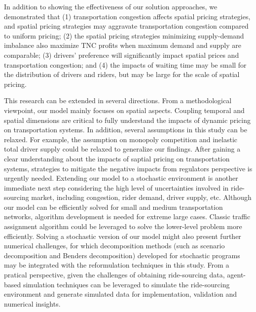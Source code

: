 \documentclass[review]{elsarticle}
\begin{document}
In addition to showing the effectiveness of our solution approaches, we demonstrated that (1) transportation congestion affects spatial pricing strategies, and spatial pricing strategies may aggravate transportation congestion compared to uniform pricing; (2) the spatial pricing strategies minimizing supply-demand imbalance also maximize TNC profits when maximum demand and supply are comparable; (3) drivers' preference will significantly impact spatial prices and transportation congestion; and (4) the impacts of waiting time may be small for the distribution of drivers and riders, but may be large for the scale of spatial pricing.

This research can be extended in several directions. From a methodological viewpoint, our model mainly focuses on spatial aspects. Coupling temporal and spatial dimensions are critical to fully understand the impacts of dynamic pricing on transportation systems. In addition, several assumptions in this study can be relaxed. For example, the assumption on monopoly competition and inelastic total driver supply could be relaxed to generalize our findings. After gaining a clear understanding about the impacts of saptial pricing on transportation systems, strategies to mitigate the negative impacts from regulators perspective is urgently needed. Extending our model to a stochastic environment is another immediate next step considering the high level of uncertainties involved in ride-sourcing market, including congestion, rider demand, driver supply, etc. Although our model can be efficiently solved for small and medium transportation networks, algorithm development is needed for extreme large cases. Classic traffic assignment algorithm could be leveraged to solve the lower-level problem more efficiently. Solving a stochastic version of our model might also present further numerical challenges, for which decomposition methods (such as scenario decomposition and Benders decomposition) developed for stochastic programs may be integrated with the reformulation techniques in this study. From a pratical perspective, given the challenges of obtaining ride-sourcing data, agent-based simulation techniques can be leveraged to simulate the ride-sourcing environment and generate simulated data for implementation, validation and numerical insights.
\end{document}

